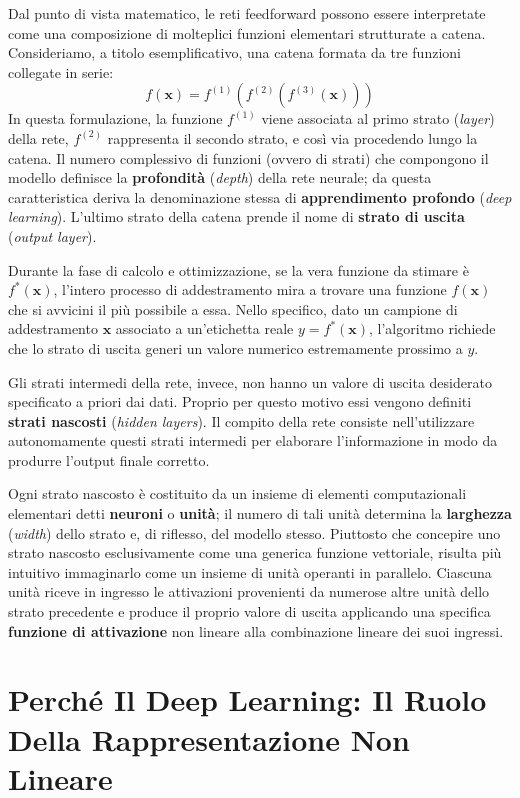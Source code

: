 ﻿\documentclass[11pt, a4paper]{article}
\begin{document}
Dal punto di vista matematico, le reti feedforward possono essere interpretate come una composizione di molteplici funzioni elementari strutturate a catena. Consideriamo, a titolo esemplificativo, una catena formata da tre funzioni collegate in serie:
\[
f(\bm{x}) = f^{(1)}\left(f^{(2)}\left(f^{(3)}(\bm{x})\right)\right)
\]
In questa formulazione, la funzione $f^{(1)}$ viene associata al primo strato (\emph{layer}) della rete, $f^{(2)}$ rappresenta il secondo strato, e così via procedendo lungo la catena. Il numero complessivo di funzioni (ovvero di strati) che compongono il modello definisce la \textbf{profondità} (\emph{depth}) della rete neurale; da questa caratteristica deriva la denominazione stessa di \textbf{apprendimento profondo} (\emph{deep learning}). L'ultimo strato della catena prende il nome di \textbf{strato di uscita} (\emph{output layer}).

Durante la fase di calcolo e ottimizzazione, se la vera funzione da stimare è $f^*(\bm{x})$, l'intero processo di addestramento mira a trovare una funzione $f(\bm{x})$ che si avvicini il più possibile a essa. Nello specifico, dato un campione di addestramento $\bm{x}$ associato a un'etichetta reale $y = f^*(\bm{x})$, l'algoritmo richiede che lo strato di uscita generi un valore numerico estremamente prossimo a $y$.

Gli strati intermedi della rete, invece, non hanno un valore di uscita desiderato specificato a priori dai dati. Proprio per questo motivo essi vengono definiti \textbf{strati nascosti} (\emph{hidden layers}). Il compito della rete consiste nell'utilizzare autonomamente questi strati intermedi per elaborare l'informazione in modo da produrre l'output finale corretto.

Ogni strato nascosto è costituito da un insieme di elementi computazionali elementari detti \textbf{neuroni} o \textbf{unità}; il numero di tali unità determina la \textbf{larghezza} (\emph{width}) dello strato e, di riflesso, del modello stesso. Piuttosto che concepire uno strato nascosto esclusivamente come una generica funzione vettoriale, risulta più intuitivo immaginarlo come un insieme di unità operanti in parallelo. Ciascuna unità riceve in ingresso le attivazioni provenienti da numerose altre unità dello strato precedente e produce il proprio valore di uscita applicando una specifica \textbf{funzione di attivazione} non lineare alla combinazione lineare dei suoi ingressi.

\newpage

\section{Perché Il Deep Learning: Il Ruolo Della Rappresentazione Non Lineare}
\end{document}
